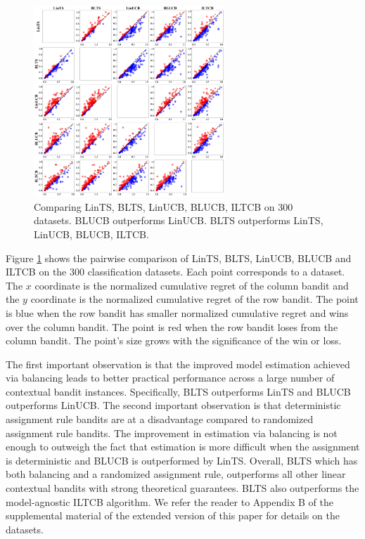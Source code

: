 \documentclass[letterpaper]{article} %
\begin{document}
\begin{figure}[!htb]
\centering
\includegraphics[width=0.855\columnwidth,height=2.835in ]{Figures/all_vs_all}
\caption{Comparing LinTS, BLTS, LinUCB, BLUCB, ILTCB on 300 datasets. BLUCB outperforms LinUCB. BLTS outperforms LinTS, LinUCB, BLUCB, ILTCB.}
\label{fig:all_vs_all}
\end{figure}

Figure \ref{fig:all_vs_all} shows the pairwise comparison of LinTS, BLTS, LinUCB, BLUCB and ILTCB on the 300 classification datasets. Each point corresponds to a dataset. The $x$ coordinate is the normalized cumulative regret of the column bandit and the $y$ coordinate is the normalized cumulative regret of the row bandit. The point is blue when the row bandit has smaller normalized cumulative regret and wins over the column bandit. The point is red when the row bandit loses from the column bandit. The point's size grows with the significance of the win or loss.

The first important observation is that the improved model estimation achieved via balancing leads to better practical performance across a large number of contextual bandit instances. Specifically, BLTS outperforms LinTS and BLUCB outperforms LinUCB.
The second important observation is that deterministic assignment rule bandits are at a disadvantage compared to randomized assignment rule bandits. The improvement in estimation via balancing is not enough to outweigh the fact that estimation is more difficult when the assignment is deterministic and BLUCB is outperformed by LinTS.
Overall, BLTS which has both balancing and a randomized assignment rule, outperforms all other linear contextual bandits with strong theoretical guarantees.
BLTS also outperforms the model-agnostic ILTCB algorithm.
\vspace{-1.67mm}
We refer the reader to Appendix B of the supplemental material of the extended version of this paper \cite{dimakopoulou2017estimation} for details on the datasets.
\end{document}
